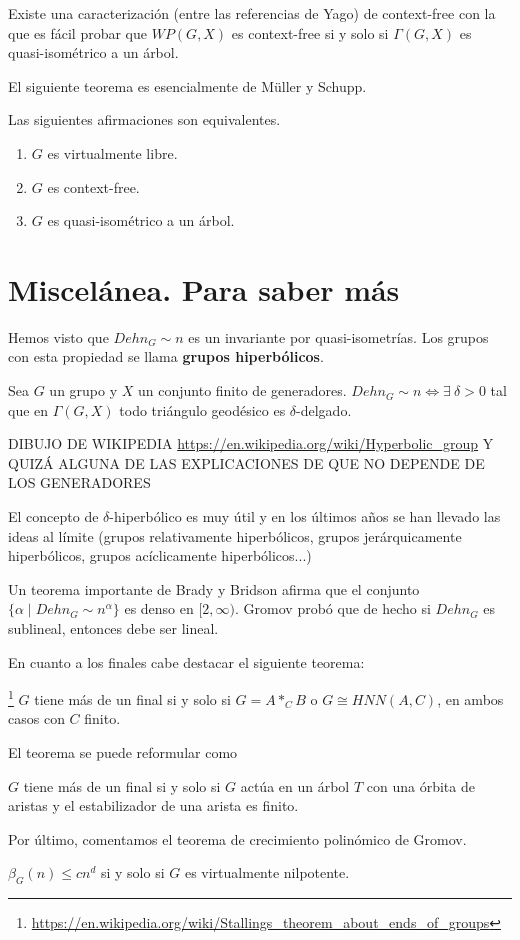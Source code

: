 \documentclass[twoside, 11pt]{article}
\begin{document}
Existe una caracterización (entre las referencias de Yago) de context-free con la que es fácil probar que $WP(G,X)$ es context-free si y solo si $\Gamma(G,X)$ es quasi-isométrico a un árbol. 

El siguiente teorema es esencialmente de Müller y Schupp. 

\begin{teorema}
Las siguientes afirmaciones son equivalentes.
\begin{enumerate}
\item $G$ es virtualmente libre.
\item $G$ es context-free.
\item $G$ es quasi-isométrico a un árbol.
\end{enumerate}
\end{teorema}

\section{Miscelánea. Para saber más}
Hemos visto que $Dehn_G\sim n$ es un invariante por quasi-isometrías. Los grupos con esta propiedad se llama \textbf{grupos hiperbólicos}.
\begin{teorema}
Sea $G$ un grupo y $X$ un conjunto finito de generadores. $Dehn_G\sim n\Leftrightarrow \exists\ \delta>0$ tal que en $\Gamma(G,X)$ todo triángulo geodésico es $\delta$-delgado. 
\end{teorema}

DIBUJO DE WIKIPEDIA \url{https://en.wikipedia.org/wiki/Hyperbolic_group} Y QUIZÁ ALGUNA DE LAS EXPLICACIONES DE QUE NO DEPENDE DE LOS GENERADORES

El concepto de $\delta$-hiperbólico es muy útil y en los últimos años se han llevado las ideas al límite (grupos relativamente hiperbólicos, grupos jerárquicamente hiperbólicos, grupos acíclicamente hiperbólicos...)

Un teorema importante de Brady y Bridson afirma que el conjunto $\{\alpha\mid Dehn_G\sim n^{\alpha}\}$ es denso en $[2,\infty)$. Gromov probó que de hecho si $Dehn_G$ es sublineal, entonces debe ser lineal. 

En cuanto a los finales cabe destacar el siguiente teorema:
\begin{teorema}[Stallings]\footnote{\url{https://en.wikipedia.org/wiki/Stallings_theorem_about_ends_of_groups}}
$G$ tiene más de un final si y solo si $G=A*_C B$ o $G\cong HNN(A,C)$, en ambos casos con $C$ finito. 
\end{teorema}

El teorema se puede reformular como
\begin{teorema}
$G$ tiene más de un final si y solo si $G$ actúa en un árbol $T$ con una órbita de aristas y el estabilizador de una arista es finito.
\end{teorema}

Por último, comentamos el teorema de crecimiento polinómico de Gromov. 
\begin{teorema}
$\beta_G(n)\leq cn^d$ si y solo si $G$ es virtualmente nilpotente. 
\end{teorema}
\end{document}
